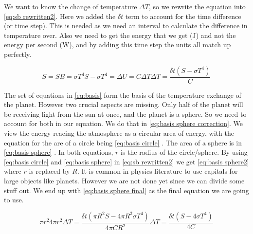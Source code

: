 We want to know the change of temperature $\Delta T$, so we rewrite the equation into \autoref{eq:sb rewritten2}. Here we added the $\delta t$ term to account for the time difference (or time 
step). This is needed as we need an interval to calculate the difference in temperature over. Also we need to get the energy that we get (\si{J}) and not the energy per second (\si{W}), and by 
adding this time step the units all match up perfectly.

\begin{subequations}
    \label{eq:basis}
    \begin{equation}
        \label{eq:stefan-boltzmann}
        S = SB = \sigma T^4
    \end{equation}
    \begin{equation}
        \label{eq:sb rewritten}
        S - \sigma T^4 = \Delta U = C \Delta T
    \end{equation}
    \begin{equation}
        \label{eq:sb rewritten2}
        \Delta T = \frac{\delta t(S - \sigma T^4)}{C}
    \end{equation}
\end{subequations}

The set of equations in \autoref{eq:basis} form the basis of the temperature exchange of the planet. However two crucial aspects are missing. Only half of the planet will be receiving light from 
the sun at once, and the planet is a sphere. So we need to account for both in our equation. We do that in \autoref{eq:basis sphere correction}. We view the energy reacing the atmosphere as a 
circular area of energy, with the equation for the are of a circle being \autoref{eq:basis circle} \cite{areaCircle}. The area of a sphere is in \autoref{eq:basis sphere} \cite{areaSphere}. In 
both equations, $r$ is the radius of the circle/sphere. By using \autoref{eq:basis circle} and \autoref{eq:basis sphere} in \autoref{eq:sb rewritten2} we get \autoref{eq:basis sphere2} where 
$r$ is replaced by $R$. It is common in physics literature to use capitals for large objects like planets. However we are not done yet since we can divide some stuff out. We end up with 
\autoref{eq:basis sphere final} as the final equation we are going to use.

\begin{subequations}
    \label{eq:basis sphere correction}
    \begin{equation}
        \label{eq:basis circle}
        \pi r^2
    \end{equation}
    \begin{equation}
        \label{eq:basis sphere}
        4 \pi r^2
    \end{equation}
    \begin{equation}
        \label{eq:basis sphere2}
        \Delta T = \frac{\delta t (\pi R^2S - 4\pi R^2\sigma T^4)}{4\pi CR^2}
    \end{equation}
    \begin{equation}
        \label{eq:basis sphere final}
        \Delta T = \frac{\delta t (S - 4\sigma T^4)}{4C}
    \end{equation}
\end{subequations}

